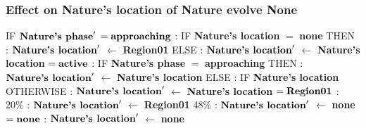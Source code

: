 \documentclass{article}%
\begin{document}
\subsubsection{Effect on Nature's location of Nature evolve None}%
\label{ssubsec:Effect on Nature's location of Nature evolve None}%
\begin{flushleft}%
IF %
$\mbox{\textbf{Nature's phase}} '$%
\linebreak%
\hspace*{2em}%
$= \mbox{\textbf{approaching}}$%
: %
IF %
\textbf{Nature's location}%
$=$%
\textbf{none}%
\linebreak%
\hspace*{4em}%
THEN %
: %
$\mbox{\textbf{Nature's location}} '$%
$\leftarrow$%
\textbf{Region01}%
\linebreak%
\hspace*{4em}%
ELSE %
: %
$\mbox{\textbf{Nature's location}} '$%
$\leftarrow$%
\textbf{Nature's location}%
\linebreak%
\hspace*{2em}%
$= \mbox{\textbf{active}}$%
: %
IF %
\textbf{Nature's phase}%
$=$%
\textbf{approaching}%
\linebreak%
\hspace*{4em}%
THEN %
: %
$\mbox{\textbf{Nature's location}} '$%
$\leftarrow$%
\textbf{Nature's location}%
\linebreak%
\hspace*{4em}%
ELSE %
: %
IF %
\textbf{Nature's location}%
\linebreak%
\hspace*{6em}%
OTHERWISE %
: %
$\mbox{\textbf{Nature's location}} '$%
$\leftarrow$%
\textbf{Nature's location}%
\linebreak%
\hspace*{6em}%
$= \mbox{\textbf{Region01}}$%
: %
\linebreak%
\hspace*{8em}%
20\%%
: %
$\mbox{\textbf{Nature's location}} '$%
$\leftarrow$%
\textbf{Region01}%
\linebreak%
\hspace*{8em}%
48\%%
: %
$\mbox{\textbf{Nature's location}} '$%
$\leftarrow$%
\textbf{none}%
\linebreak%
\hspace*{2em}%
$= \mbox{\textbf{none}}$%
: %
$\mbox{\textbf{Nature's location}} '$%
$\leftarrow$%
\textbf{none}%
\end{flushleft}

%
\end{document}
